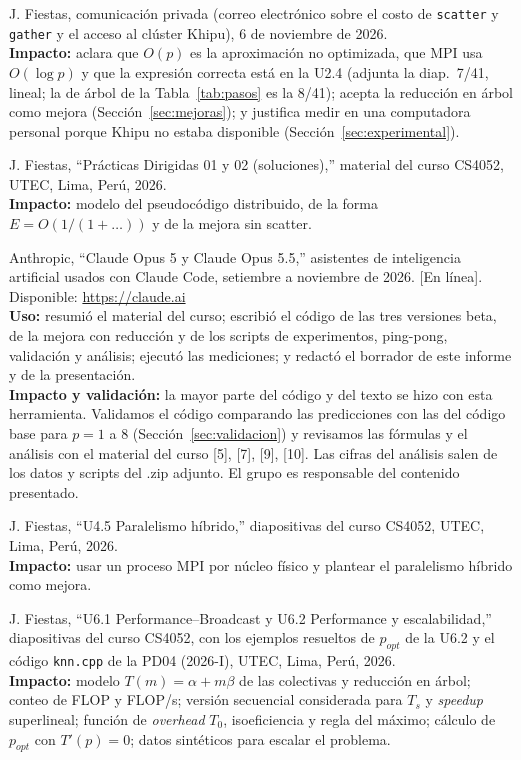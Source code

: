 \documentclass[11pt,a4paper]{article}
\begin{document}
\begin{enumerate}[label={[\arabic*]}, leftmargin=*, itemsep=2pt, parsep=0pt, topsep=2pt]
  \item J. Fiestas, comunicación privada (correo electrónico sobre el costo de \texttt{scatter} y \texttt{gather} y el acceso al clúster Khipu), 6 de noviembre de 2026.\\
  \textbf{Impacto:} aclara que $O(p)$ es la aproximación no optimizada, que MPI usa $O(\log p)$ y que la expresión correcta está en la U2.4 (adjunta la diap.~7/41, lineal; la de árbol de la Tabla~\ref{tab:pasos} es la 8/41); acepta la reducción en árbol como mejora (Sección~\ref{sec:mejoras}); y justifica medir en una computadora personal porque Khipu no estaba disponible (Sección~\ref{sec:experimental}).

  \item J. Fiestas, ``Prácticas Dirigidas 01 y 02 (soluciones),'' material del curso CS4052, UTEC, Lima, Perú, 2026.\\
  \textbf{Impacto:} modelo del pseudocódigo distribuido, de la forma $E = O(1/(1 + \dots))$ y de la mejora sin scatter.

  \item Anthropic, ``Claude Opus 5 y Claude Opus 5.5,'' asistentes de inteligencia artificial usados con Claude Code, setiembre a noviembre de 2026. [En línea]. Disponible: \url{https://claude.ai}\\
  \textbf{Uso:} resumió el material del curso; escribió el código de las tres versiones beta, de la mejora con reducción y de los scripts de experimentos, ping-pong, validación y análisis; ejecutó las mediciones; y redactó el borrador de este informe y de la presentación.\\
  \textbf{Impacto y validación:} la mayor parte del código y del texto se hizo con esta herramienta. Validamos el código comparando las predicciones con las del código base para $p = 1$ a $8$ (Sección~\ref{sec:validacion}) y revisamos las fórmulas y el análisis con el material del curso [5], [7], [9], [10]. Las cifras del análisis salen de los datos y scripts del .zip adjunto. El grupo es responsable del contenido presentado.

  \item J. Fiestas, ``U4.5 Paralelismo híbrido,'' diapositivas del curso CS4052, UTEC, Lima, Perú, 2026.\\
  \textbf{Impacto:} usar un proceso MPI por núcleo físico y plantear el paralelismo híbrido como mejora.

  \item J. Fiestas, ``U6.1 Performance--Broadcast y U6.2 Performance y escalabilidad,'' diapositivas del curso CS4052, con los ejemplos resueltos de $p_{opt}$ de la U6.2 y el código \texttt{knn.cpp} de la PD04 (\mbox{2026-I}), UTEC, Lima, Perú, 2026.\\
  \textbf{Impacto:} modelo $T(m) = \alpha + m\beta$ de las colectivas y reducción en árbol; conteo de FLOP y FLOP/s; versión secuencial considerada para $T_s$ y \textit{speedup} superlineal; función de \textit{overhead} $T_0$, isoeficiencia y regla del máximo; cálculo de $p_{opt}$ con $T'(p) = 0$; datos sintéticos para escalar el problema.
\end{enumerate}
\end{document}
